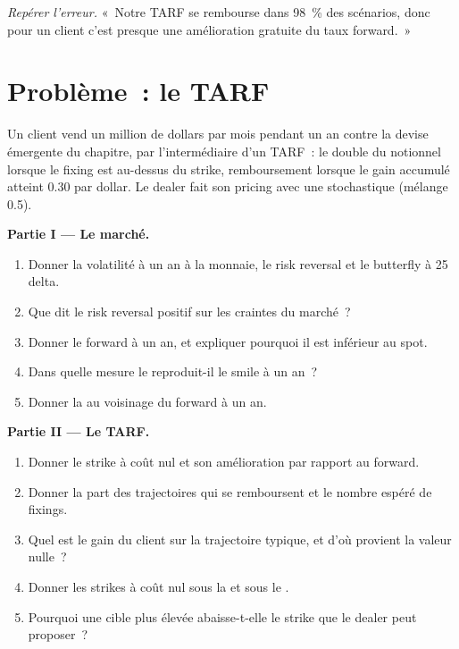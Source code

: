 \begin{exercise}[$\star\star\star$]\label{exo:dv:fx-derivatives:8}
\emph{Repérer l'erreur.} «~Notre TARF se rembourse dans 98~\% des scénarios, donc pour un client c'est presque une amélioration gratuite du taux forward.~»
\end{exercise}

\section{Problème~: le TARF}

\begin{problem}\label{pb:dv:fx-derivatives:1}
Un client vend un million de dollars par mois pendant un an contre la devise émergente du chapitre, par l'intermédiaire d'un TARF~: le double du notionnel lorsque le fixing
est au-dessus du strike, remboursement lorsque le gain accumulé atteint 0.30 par dollar. Le dealer fait son pricing avec une  stochastique (mélange 0.5).

\medskip\noindent\textbf{Partie I --- Le marché.}
\begin{enumerate}
\item Donner la volatilité à un an à la monnaie, le risk reversal et le butterfly à 25 delta.
\item Que dit le risk reversal positif sur les craintes du marché~?
\item Donner le forward à un an, et expliquer pourquoi il est inférieur au spot.
\item Dans quelle mesure le  reproduit-il le smile à un an~?
\item Donner la  au voisinage du forward à un an.
\end{enumerate}

\medskip\noindent\textbf{Partie II --- Le TARF.}
\begin{enumerate}[resume]
\item Donner le strike à coût nul et son amélioration par rapport au forward.
\item Donner la part des trajectoires qui se remboursent et le nombre espéré de fixings.
\item Quel est le gain du client sur la trajectoire typique, et d'où provient la valeur nulle~?
\item Donner les strikes à coût nul sous la  et sous le .
\item Pourquoi une cible plus élevée abaisse-t-elle le strike que le dealer peut proposer~?
\end{enumerate}


\end{problem}
